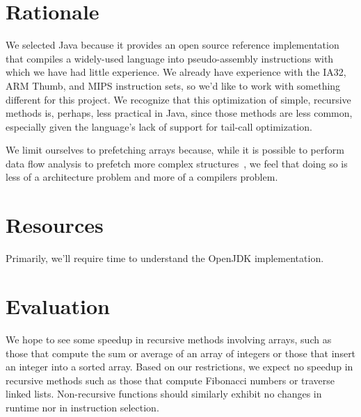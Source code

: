 \documentclass[journal,onecolumn]{IEEEtran}
\begin{document}
\section{Rationale}

We selected Java because it provides an open source reference implementation that compiles a widely-used language into pseudo-assembly instructions with which we have had little experience. We already have experience with the IA32, ARM Thumb, and MIPS instruction sets, so we'd like to work with something different for this project. We recognize that this optimization of simple, recursive methods is, perhaps, less practical in Java, since those methods are less common, especially given the language's lack of support for tail-call optimization.

We limit ourselves to prefetching arrays because, while it is possible to perform data flow analysis to prefetch more complex structures~\cite{mckinley}, we feel that doing so is less of a architecture problem and more of a compilers problem.


\section{Resources}

Primarily, we'll require time to understand the OpenJDK implementation.


\section{Evaluation}

We hope to see some speedup in recursive methods involving arrays, such as those that compute the sum or average of an array of integers or those that insert an integer into a sorted array. Based on our restrictions, we expect no speedup in recursive methods such as those that compute Fibonacci numbers or traverse linked lists. Non-recursive functions should similarly exhibit no changes in runtime nor in instruction selection.
\end{document}
